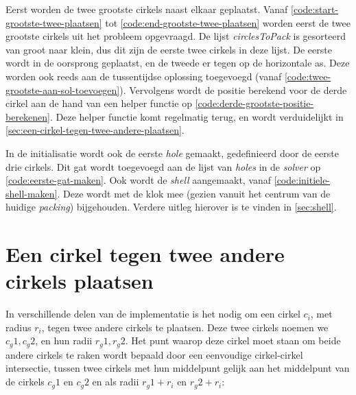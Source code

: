 \documentclass[12pt,a4paper,oneside]{book}
\begin{document}
Eerst worden de twee grootste cirkels naast elkaar geplaatst.
Vanaf \autoref{code:start-grootste-twee-plaatsen} tot \autoref{code:end-grootste-twee-plaatsen} worden eerst de twee grootste cirkels uit het probleem opgevraagd.
De lijst \textit{circlesToPack} is gesorteerd van groot naar klein, dus dit zijn de eerste twee cirkels in deze lijst.
De eerste wordt in de oorsprong geplaatst, en de tweede er tegen op de horizontale as.
Deze worden ook reeds aan de tussentijdse oplossing toegevoegd (vanaf \autoref{code:twee-grootste-aan-sol-toevoegen}).
Vervolgens wordt de positie berekend voor de derde cirkel aan de hand van een helper functie op \autoref{code:derde-grootste-positie-berekenen}.
Deze helper functie komt regelmatig terug, en wordt verduidelijkt in \autoref{sec:een-cirkel-tegen-twee-andere-plaatsen}.

In de initialisatie wordt ook de eerste \textit{hole} gemaakt, gedefinieerd door de eerste drie cirkels.
Dit gat wordt toegevoegd aan de lijst van \textit{holes} in de \textit{solver} op \autoref{code:eerste-gat-maken}.
Ook wordt de \textit{shell} aangemaakt, vanaf \autoref{code:initiele-shell-maken}.
Deze wordt met de klok mee (gezien vanuit het centrum van de huidige \textit{packing}) bijgehouden.
Verdere uitleg hierover is te vinden in \autoref{sec:shell}.

\section{Een cirkel tegen twee andere cirkels plaatsen} \label{sec:een-cirkel-tegen-twee-andere-plaatsen}

In verschillende delen van de implementatie is het nodig om een cirkel $c_i$, met radius $r_i$, tegen twee andere cirkels te plaatsen.
Deze twee cirkels noemen we $c_g1, c_g2$, en hun radii $r_g1, r_g2$.
Het punt waarop deze cirkel moet staan om beide andere cirkels te raken wordt bepaald door een eenvoudige cirkel-cirkel intersectie, tussen twee cirkels met hun middelpunt gelijk aan het middelpunt van de cirkels $c_g1$ en $c_g2$ en als radii $r_g1+r_i$ en $r_g2+r_i$:
\end{document}
